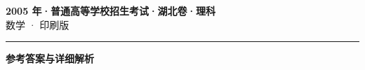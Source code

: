 \documentclass[zihao=5, a4paper]{ctexart}
\begin{document}
\begin{center}
  {\Large\bfseries 2005 年·普通高等学校招生考试·湖北卷·理科}\\[4pt]
  {\large 数学 · 印刷版}
\end{center}
\medskip
{}

\par\bigskip\hrule\bigskip
{}
\begin{center}{\large\bfseries 参考答案与详细解析}\end{center}
\smallskip

\end{document}
